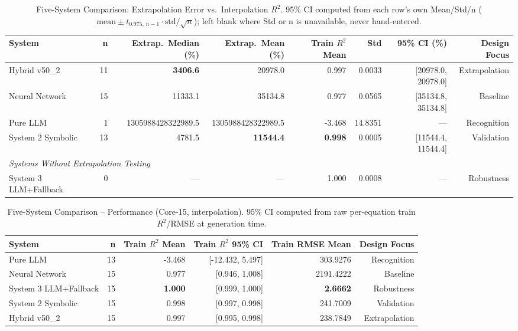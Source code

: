 \documentclass[twoside,11pt]{article}
\begin{document}
\begin{table}[t]
\centering
\caption{Five-System Comparison: Extrapolation Error vs.\ Interpolation $R^2$.
  95\% CI computed from each row's own Mean/Std/n
  ($\mathrm{mean} \pm t_{0.975,\,n-1} \cdot \mathrm{std}/\sqrt{n}$); left
  blank where Std or n is unavailable, never hand-entered.}
\label{tab:five_systems_full}
\begin{tabular}{lrrrrrrr}
\toprule
\textbf{System} & \textbf{n}
  & \textbf{Extrap.\ Median (\%)} & \textbf{Extrap.\ Mean (\%)}
  & \textbf{Train $R^2$ Mean} & \textbf{Std} & \textbf{95\% CI (\%)}
  & \textbf{Design Focus} \\
\midrule
Hybrid v50\_2 & 11 & \textbf{3406.6} & 20978.0 & 0.997 & 0.0033 & [20978.0, 20978.0] & Extrapolation \\
Neural Network & 15 & 11333.1 & 35134.8 & 0.977 & 0.0565 & [35134.8, 35134.8] & Baseline \\
Pure LLM & 1 & 1305988428322989.5 & 1305988428322989.5 & -3.468 & 14.8351 & --- & Recognition \\
System 2 Symbolic & 13 & 4781.5 & \textbf{11544.4} & \textbf{0.998} & 0.0005 & [11544.4, 11544.4] & Validation \\
\midrule
\multicolumn{8}{l}{\textit{Systems Without Extrapolation Testing}} \\
System 3 LLM+Fallback & 0 & --- & --- & 1.000 & 0.0008 & --- & Robustness \\
\bottomrule
\end{tabular}
\end{table}

\begin{table}[t]
\centering
\caption{Five-System Comparison -- Performance (Core-15, interpolation).
  95\% CI computed from raw per-equation train $R^2$/RMSE at generation time.}
\label{tab:five_systems_performance}
\begin{tabular}{lrrrrr}
\toprule
\textbf{System} & \textbf{n} & \textbf{Train $R^2$ Mean}
  & \textbf{Train $R^2$ 95\% CI} & \textbf{Train RMSE Mean}
  & \textbf{Design Focus} \\
\midrule
Pure LLM & 13 & -3.468 & [-12.432, 5.497] & 303.9276 & Recognition \\
Neural Network & 15 & 0.977 & [0.946, 1.008] & 2191.4222 & Baseline \\
System 3 LLM+Fallback & 15 & \textbf{1.000} & [0.999, 1.000] & \textbf{2.6662} & Robustness \\
System 2 Symbolic & 15 & 0.998 & [0.997, 0.998] & 241.7009 & Validation \\
Hybrid v50\_2 & 15 & 0.997 & [0.995, 0.998] & 238.7849 & Extrapolation \\
\bottomrule
\end{tabular}
\end{table}
\end{document}
